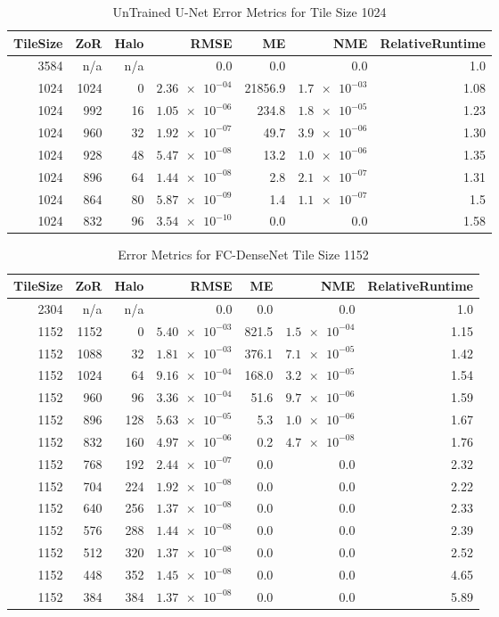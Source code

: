\documentclass[10pt, indentfirst]{article}
\begin{document}
\begin{table}[h!]
	\centering
	\caption{UnTrained U-Net Error Metrics for Tile Size 1024}
	\label{tab:tile_size_1024}
	\begin{tabular}{r|r|r|r|r|r|r}
		TileSize & ZoR & Halo & RMSE    & ME & NME & RelativeRuntime \\ 
		\hline
		3584 & n/a & n/a & 0.0 & 0.0 & 0.0 & 1.0 \\
		1024 & 1024 & 0 & $\num{2.36e-04}$ & 21856.9 & $\num{1.7e-03}$ & 1.08 \\
		1024 & 992 & 16 & $\num{1.05e-06}$ & 234.8 & $\num{1.8e-05}$ & 1.23 \\
		1024 & 960 & 32 & $\num{1.92e-07}$ & 49.7 & $\num{3.9e-06}$ & 1.30 \\
		1024 & 928 & 48 & $\num{5.47e-08}$ & 13.2 & $\num{1.0e-06}$ & 1.35 \\
		1024 & 896 & 64 & $\num{1.44e-08}$ & 2.8 & $\num{2.1e-07}$ & 1.31 \\
		1024 & 864 & 80 & $\num{5.87e-09}$ & 1.4 & $\num{1.1e-07}$ & 1.5 \\
		1024 & 832 & 96 & $\num{3.54e-10}$ & 0.0 & 0.0 & 1.58 \\
	\end{tabular}
\end{table}


\begin{table}[h!]
	\centering
	\caption{Error Metrics for FC-DenseNet Tile Size 1152}
	\label{tab:tile_size_1152}
	\begin{tabular}{r|r|r|r|r|r|r}
		TileSize & ZoR & Halo & RMSE    & ME & NME & RelativeRuntime \\ 
		\hline
		2304 & n/a & n/a & 0.0 & 0.0 & 0.0 & 1.0 \\
		1152 & 1152 & 0 & $\num{5.40e-03}$ & 821.5 & $\num{1.5e-04}$ & 1.15 \\
		1152 & 1088 & 32 & $\num{1.81e-03}$ & 376.1 & $\num{7.1e-05}$ & 1.42 \\
		1152 & 1024 & 64 & $\num{9.16e-04}$ & 168.0 & $\num{3.2e-05}$ & 1.54 \\
		1152 & 960 & 96 & $\num{3.36e-04}$ & 51.6 & $\num{9.7e-06}$ & 1.59 \\
		1152 & 896 & 128 & $\num{5.63e-05}$ & 5.3 & $\num{1.0e-06}$ & 1.67 \\
		1152 & 832 & 160 & $\num{4.97e-06}$ & 0.2 & $\num{4.7e-08}$ & 1.76 \\
		1152 & 768 & 192 & $\num{2.44e-07}$ & 0.0 & 0.0 & 2.32 \\
		1152 & 704 & 224 & $\num{1.92e-08}$ & 0.0 & 0.0 & 2.22 \\
		1152 & 640 & 256 & $\num{1.37e-08}$ & 0.0 & 0.0 & 2.33 \\
		1152 & 576 & 288 & $\num{1.44e-08}$ & 0.0 & 0.0 & 2.39 \\
		1152 & 512 & 320 & $\num{1.37e-08}$ & 0.0 & 0.0 & 2.52 \\
		1152 & 448 & 352 & $\num{1.45e-08}$ & 0.0 & 0.0 & 4.65 \\
		1152 & 384 & 384 & $\num{1.37e-08}$ & 0.0 & 0.0 & 5.89 \\
	\end{tabular}
\end{table}
\end{document}

